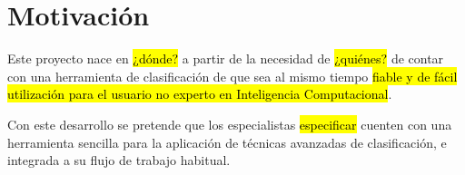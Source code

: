 %
%
%
\section{Motivación}
%
Este proyecto nace en \hl{¿dónde?} a partir de la necesidad de
\hl{¿quiénes?} de contar con una herramienta de clasificación de
 que sea al mismo tiempo \hl{fiable y de fácil utilización
  para el usuario no experto en Inteligencia Computacional}.


Con este desarrollo se pretende que los especialistas \hl{especificar}
cuenten con una herramienta sencilla para la aplicación de técnicas
avanzadas de clasificación, e integrada a su flujo de trabajo
habitual.
